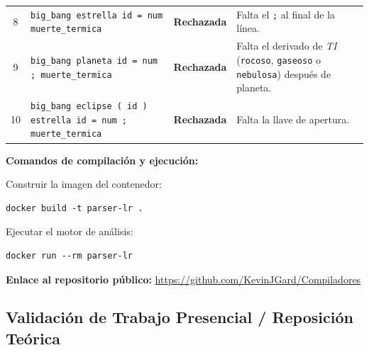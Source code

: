 \documentclass[12pt, letterpaper]{article}
\begin{document}
\begin{table}[h!]
\begin{tabular}{c p{6cm} c p{4.5cm}}
8 & \texttt{big\_bang estrella id = num muerte\_termica} & \textbf{\color{accent}Rechazada} & Falta el \texttt{;} al final de la línea. \\

9 & \texttt{big\_bang planeta id = num ; muerte\_termica} & \textbf{\color{accent}Rechazada} & Falta el derivado de \textit{TI} (\texttt{rocoso}, \texttt{gaseoso} o \texttt{nebulosa}) después de planeta. \\

10 & \texttt{big\_bang eclipse ( id ) estrella id = num ; muerte\_termica} & \textbf{\color{accent}Rechazada} & Falta la llave de apertura. \\
\bottomrule
\end{tabular}
\end{table}

\textbf{Comandos de compilación y ejecución:}

Construir la imagen del contenedor:
\begin{lstlisting}[style=bashstyle]
docker build -t parser-lr .
\end{lstlisting}
Ejecutar el motor de análisis:
\begin{lstlisting}[style=bashstyle]
docker run --rm parser-lr
\end{lstlisting}

\textbf{Enlace al repositorio público:} 
\url{https://github.com/KevinJGard/Compiladores}

\newpage
\subsection*{Validación de Trabajo Presencial / Reposición Teórica}
\end{document}

